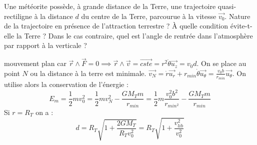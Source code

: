 \begin{Exercise}[title=Chute d'une comète]
  Une météorite possède, à grande distance de la Terre, une trajectoire quasi-rectiligne à la distance $d$ du centre de la Terre, parcourue à la vitesse $\vec{v_0}$.
    \Question Nature de la trajectoire en présence de l'attraction  terrestre ?
    \Question À quelle condition évite-t-elle la Terre ?
    \Question Dans le cas contraire, quel est l'angle de rentrée dans l'atmosphère par rapport à la verticale ?
\end{Exercise}
\begin{Answer}
  \Question mouvement plan car $\vec{r} \wedge \vec{F} = 0 \implies \vec{r} \wedge \vec{v} = \vec{cste} =  r^2 \dot{\theta}\vec{u_z}  = v_0 d$.
  \Question  On se place au point $N$ ou la distance à la terre est minimale. $\vec{v_N} = \dot{r}\vec{u_r}+r_{min}\dot{\theta}\vec{u_\theta} = \frac{v_0b}{r_{min}}\vec{u_\theta}$.
  On utilise alors la conservation de l'énergie : \[E_m = \frac{1}{2}mv_0^2 = \frac{1}{2}mv_{N}^2-\frac{GM_Tm}{r_{min}} = \frac{1}{2}m \frac{v_0^2b^2}{r_{min^2}}-\frac{G M_T m}{r_{min}} \]
  Si $r = R_T$ on a :
 \[
   d = R_T \sqrt{1+\frac{2GM_T}{R_Tv_0^2}} =R_T \sqrt{1+\frac{v_{lib}^2}{v_0^2}}
 \]
 \Question

\end{Answer}
